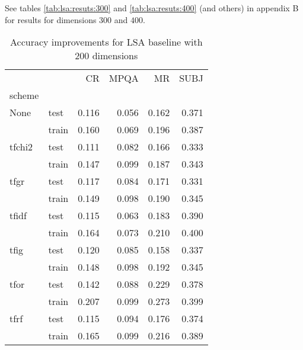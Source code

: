     See tables \ref{tab:lsa:resuts:300} and \ref{tab:lsa:resuts:400} (and others) in appendix B for results for dimensions $300$ and $400$.
    
\begin{table}[H]
\begin{center}

\begin{tabular}{llrrrr}
\toprule
{} &      &  CR &  MPQA &  MR &  SUBJ \\
scheme &  &            &              &            &              \\
\midrule
None & test &      0.116 &        0.056 &      0.162 &        0.371 \\
{} & train &      0.160 &        0.069 &      0.196 &        0.387 \\
tfchi2 & test &      0.111 &        0.082 &      0.166 &        0.333 \\
{} & train &      0.147 &        0.099 &      0.187 &        0.343 \\
tfgr & test &      0.117 &        0.084 &      0.171 &        0.331 \\
{} & train &      0.149 &        0.098 &      0.190 &        0.345 \\
tfidf & test &      0.115 &        0.063 &      0.183 &        0.390 \\
{} & train &      0.164 &        0.073 &      0.210 &        0.400 \\
tfig & test &      0.120 &        0.085 &      0.158 &        0.337 \\
{} & train &      0.148 &        0.098 &      0.192 &        0.345 \\
tfor & test &      0.142 &        0.088 &      0.229 &        0.378 \\
{} & train &      0.207 &        0.099 &      0.273 &        0.399 \\
tfrf & test &      0.115 &        0.094 &      0.176 &        0.374 \\
{} & train &      0.165 &        0.099 &      0.216 &        0.389 \\
\bottomrule
\end{tabular}

\caption[Accuracy improvements for LSA baseline with 200 dimensions]{Accuracy improvements for LSA baseline with 200 dimensions}
\label{tab:lsa:resuts:200:main}
\end{center}
\end{table}
    

